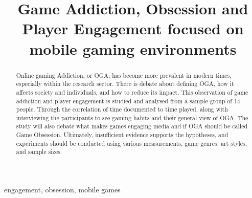 \documentclass[conference]{IEEEtran}
\begin{document}


\lstset{style=style}

\title{Game Addiction, Obsession and Player Engagement focused on mobile gaming environments \\
}

\author{
}

\maketitle



\begin{abstract}
Online gaming Addiction, or OGA, has become more prevalent in modern times, especially within the research sector. There is debate about defining OGA, how it affects society and individuals, and how to reduce its impact. This observation of game addiction and player engagement is studied and analysed from a sample group of 14 people. Through the correlation of time documented to time played, along with interviewing the participants to see gaming habits and their general view of OGA. The study will also debate what makes games engaging media and if OGA should be called Game Obsession. Ultimately, insufficient evidence supports the hypotheses, and experiments should be conducted using various measurements, game genres, art styles, and sample sizes.
\end{abstract}
\begin{IEEEkeywords}
engagement, obsession, mobile games
\end{IEEEkeywords}
\end{document}
